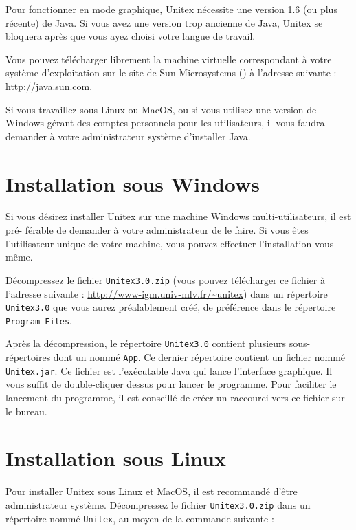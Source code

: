 \bigskip
\noindent Pour fonctionner en mode graphique, Unitex nécessite une version 1.6 (ou plus récente)
de Java. Si vous avez une version trop ancienne de Java, Unitex se bloquera après que vous
ayez choisi votre langue de travail.


\bigskip
\noindent Vous pouvez télécharger librement la machine virtuelle correspondant à votre 
système d’exploitation sur le site de Sun Microsystems (\cite{site-java}) à l’adresse suivante : 
\url{http://java.sun.com}.

\bigskip
\noindent Si vous travaillez sous Linux ou MacOS, ou si vous
utilisez une version de Windows gérant des comptes personnels pour les utilisateurs, il vous
faudra demander à votre administrateur système d’installer Java.



\section{Installation sous Windows}
    Si vous désirez installer Unitex sur une machine Windows multi-utilisateurs, il est pré-
férable de demander à votre administrateur de le faire. Si vous êtes l’utilisateur unique de
votre machine, vous pouvez effectuer l’installation vous-même.

\bigskip
\noindent Décompressez le fichier  \verb+Unitex3.0.zip+
(vous pouvez télécharger ce fichier à l’adresse suivante : \url{http://www-igm.univ-mlv.fr/~unitex})
dans un répertoire \verb+Unitex3.0+ que vous aurez préalablement créé, de préférence dans le répertoire  \verb+Program Files+.

\bigskip
\noindent Après la décompression, le répertoire \verb+Unitex3.0+ contient plusieurs
sous-répertoires dont un nommé \verb+App+. Ce dernier répertoire contient un fichier nommé
\verb+Unitex.jar+.                                                            Ce fichier est l’exécutable Java qui lance l’interface graphique. Il vous suffit de double-cliquer
dessus pour lancer le programme.
Pour faciliter le lancement du programme, il est conseillé de créer un raccourci vers ce fichier sur le bureau.


\section{Installation sous Linux}
Pour installer Unitex sous Linux et MacOS, il est recommandé d’être administrateur système. Décompressez le fichier \verb+Unitex3.0.zip+ dans un répertoire nommé
\verb+Unitex+, au moyen de la commande suivante :


